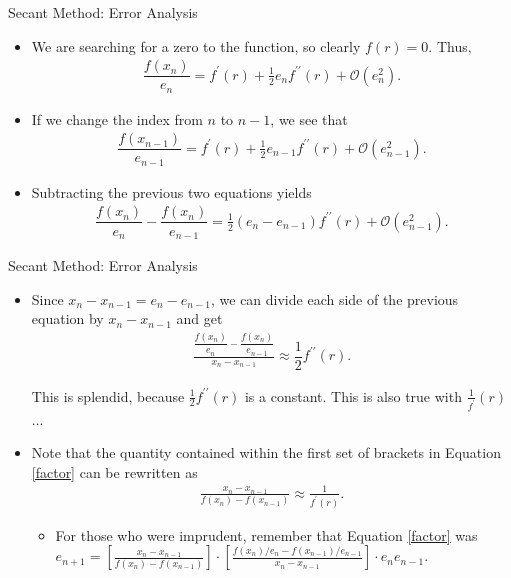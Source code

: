 \documentclass[9pt, serif]{beamer}
\newcommand{\bi}{\begin{itemize}}
\newcommand{\ei}{\end{itemize}}
\begin{document}
\begin{frame}{\hspace{50mm}Secant Method: Error Analysis}
	\bi
		\item We are searching for a zero to the function, so clearly $f(r)=0$. Thus,
			\begin{align*}
				\dfrac{f(x_n)}{e_{n}}=f^\prime(r)+\frac{1}{2}e_nf^{\prime\prime}(r)+\mathcal{O}(e^2_n).
			\end{align*}
		\pause
		\item If we change the index from $n$ to $n-1$, we see that
			\begin{align*}
				\dfrac{f(x_{n-1})}{e_{n-1}}=f^\prime(r)+\frac{1}{2}e_{n-1}f^{\prime\prime}(r)+\mathcal{O}(e^2_{n-1}).
			\end{align*}
		\pause
		\item Subtracting the previous two equations yields 
			\begin{align*}
				\dfrac{f(x_n)}{e_n}-\dfrac{f(x_n)}{e_{n-1}}=\frac{1}{2}(e_n-e_{n-1})f^{\prime\prime}(r)+\mathcal{O}(e^2_{n-1}).
			\end{align*}
	\ei
\end{frame}

\begin{frame}{\hspace{50mm}Secant Method: Error Analysis}
	\bi
		\item Since $x_n-x_{n-1}=e_n-e_{n-1}$, we can divide each side of the previous equation by $x_n-x_{n-1}$ and get
			\begin{align*}
				\frac{\dfrac{f(x_n)}{e_n}-\dfrac{f(x_n)}{e_{n-1}}}{x_n-x_{n-1}}\approx\dfrac{1}{2}f^{\prime\prime}(r). %
			\end{align*}
			
			This is splendid, because $\frac{1}{2}f^{\prime\prime}(r)$ is a constant. This is also true with $\frac{1}{f^{\prime}}(r)$...
		\pause
		\item Note that the quantity contained within the first set of brackets in Equation \eqref{factor} can be rewritten as
			\begin{align*}
				\frac{x_n-x_{n-1}}{f(x_n)-f(x_{n-1})}\approx\frac{1}{f^\prime(r)}.
			\end{align*}
		\bi
			\item For those who were imprudent, remember that Equation \eqref{factor} was $e_{n+1}=\left[\frac{x_n-x_{n-1}}{f(x_n)-f(x_{n-1})}\right]\cdot\left[\frac{f(x_n)/e_n-f(x_{n-1})/e_{n-1}}{x_n-x_{n-1}}\right]\cdot e_ne_{n-1}$.
		\ei
	\ei
\end{frame}
\end{document}
